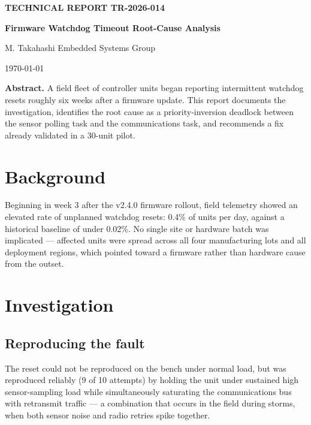 \documentclass[11pt,a4paper]{article}
\begin{document}
\begin{center}
{\Large\bfseries\color{techaccent} TECHNICAL REPORT TR-2026-014\par}
\vspace{0.4cm}
{\huge\bfseries Firmware Watchdog Timeout Root-Cause Analysis\par}
\vspace{0.6cm}
{\large M. Takahashi \quad Embedded Systems Group\par}
\vspace{0.2cm}
{\large \today\par}
\end{center}

\vspace{1cm}

\noindent\textbf{Abstract.} A field fleet of controller units began
reporting intermittent watchdog resets roughly six weeks after a
firmware update. This report documents the investigation, identifies
the root cause as a priority-inversion deadlock between the sensor
polling task and the communications task, and recommends a fix
already validated in a 30-unit pilot.

\section{Background}

Beginning in week 3 after the v2.4.0 firmware rollout, field
telemetry showed an elevated rate of unplanned watchdog resets: 0.4\%
of units per day, against a historical baseline of under 0.02\%. No
single site or hardware batch was implicated --- affected units were
spread across all four manufacturing lots and all deployment regions,
which pointed toward a firmware rather than hardware cause from the
outset.

\section{Investigation}

\subsection{Reproducing the fault}

The reset could not be reproduced on the bench under normal load, but
was reproduced reliably (9 of 10 attempts) by holding the unit under
sustained high sensor-sampling load while simultaneously saturating
the communications bus with retransmit traffic --- a combination that
occurs in the field during storms, when both sensor noise and radio
retries spike together.
\end{document}
